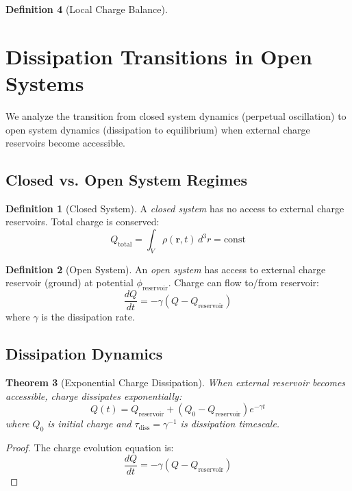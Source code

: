\documentclass[12pt,a4paper]{article}
\theoremstyle{plain}
\newtheorem{theorem}{Theorem}[section]
\theoremstyle{definition}
\newtheorem{definition}[theorem]{Definition}
\theoremstyle{remark}
\begin{document}
\begin{definition}[Local Charge Balance]
\section{Dissipation Transitions in Open Systems}
\label{sec:dissipation}

We analyze the transition from closed system dynamics (perpetual oscillation) to open system dynamics (dissipation to equilibrium) when external charge reservoirs become accessible.

\subsection{Closed vs. Open System Regimes}

\begin{definition}[Closed System]
\label{def:closed_system}
A \emph{closed system} has no access to external charge reservoirs. Total charge is conserved:
\begin{equation}
Q_{\text{total}} = \int_V \rho(\mathbf{r},t) \, d^3r = \text{const}
\end{equation}
\end{definition}

\begin{definition}[Open System]
\label{def:open_system}
An \emph{open system} has access to external charge reservoir (ground) at potential $\phi_{\text{reservoir}}$. Charge can flow to/from reservoir:
\begin{equation}
\frac{dQ}{dt} = -\gamma (Q - Q_{\text{reservoir}})
\end{equation}
where $\gamma$ is the dissipation rate.
\end{definition}

\subsection{Dissipation Dynamics}

\begin{theorem}[Exponential Charge Dissipation]
\label{thm:exponential_dissipation}
When external reservoir becomes accessible, charge dissipates exponentially:
\begin{equation}
Q(t) = Q_{\text{reservoir}} + (Q_0 - Q_{\text{reservoir}}) e^{-\gamma t}
\end{equation}
where $Q_0$ is initial charge and $\tau_{\text{diss}} = \gamma^{-1}$ is dissipation timescale.
\end{theorem}

\begin{proof}
The charge evolution equation is:
\begin{equation}
\frac{dQ}{dt} = -\gamma (Q - Q_{\text{reservoir}})
\end{equation}


\end{proof}
\end{definition}
\end{document}
